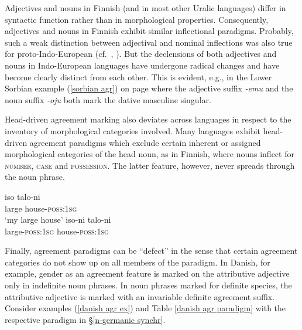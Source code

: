 Adjectives and nouns in Finnish (and in most other Uralic languages) differ in syntactic function rather than in morphological properties. Consequently, adjectives and nouns in Finnish exhibit similar inflectional paradigms. Probably, such a weak distinction between adjectival and nominal inflections was also true for proto-Indo-European (cf.~\citealt[80]{comrie1998}, \citealt[139]{kuriaki2007}). But the declensions of both adjectives and nouns in Indo-European languages have undergone radical changes and have become clearly distinct from each other. This is evident, e.g., in the Lower Sorbian example (\ref{sorbian agr}) on page \pageref{sorbian agr} where the adjective suffix \textit{-emu} and the noun suffix \textit{-oju} both mark the dative masculine singular.

Head-driven agreement marking also deviates across languages in respect to the inventory of morphological categories involved. Many languages exhibit head-driven agreement paradigms which exclude certain inherent or assigned morphological categories of the head noun, as in Finnish, where nouns inflect for \textsc{number}, \textsc{case} and \textsc{possession}. The latter feature, however, never spreads through the noun phrase.
\begin{exe}
\ex
{}
\begin{xlist}
\ex
\gll 	iso		talo-ni\\
	large	house-\textsc{poss:1sg}\\
\glt	‘my large house’
\ex
\gll 	*iso-ni	talo-ni\\
	large-\textsc{poss:1sg}	house-\textsc{poss:1sg}\\
\end{xlist}
\end{exe}
Finally, agreement paradigms can be “defect” in the sense that certain agreement categories do not show up on all members of the paradigm. In Danish, for example, gender as an agreement feature is marked on the attributive adjective only in indefinite noun phrases. In noun phrases marked for definite species, the attributive adjective is marked with an invariable definite agreement suffix. Consider examples (\ref{danish agr ex}) and Table \ref{danish agr paradigm} with the respective paradigm in \S\ref{n-germanic synchr}.

